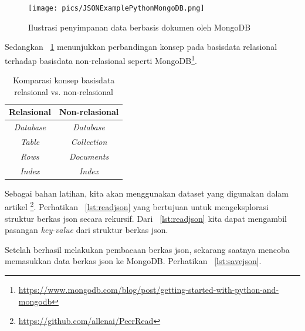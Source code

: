 \begin{figure}
  \begin{center}
    \texttt{[image: pics/JSONExamplePythonMongoDB.png]}
    \caption{Ilustrasi penyimpanan data berbasis dokumen oleh MongoDB}
    \label{fig:jsonmongo}
  \end{center}
\end{figure}

Sedangkan \tablename~\ref{tab:relasimongo} menunjukkan perbandingan konsep pada basisdata relasional terhadap basisdata non-relasional seperti MongoDB\footnote{\url{https://www.mongodb.com/blog/post/getting-started-with-python-and-mongodb}}.

\begin{table}[h]
\caption{Komparasi konsep basisdata relasional vs. non-relasional}
\label{tab:relasimongo}
  \begin{center}
    \begin{tabular}{@{}cc@{}}\toprule
    Relasional & Non-relasional\\ \midrule
  \textit{Database} & \textit{Database} \\ 
  \textit{Table} & \textit{Collection} \\
  \textit{Rows} & \textit{Documents}\\
  \textit{Index} & \textit{Index}\\
       \bottomrule
    \end{tabular}
  \end{center}
\end{table}

Sebagai bahan latihan, kita akan menggunakan dataset yang digunakan dalam artikel \cite{peerreview}\footnote{\url{https://github.com/allenai/PeerRead}}. Perhatikan \lstlistingname~\ref{lst:readjson} yang bertujuan untuk mengeksplorasi struktur berkas json secara rekursif. Dari \lstlistingname~\ref{lst:readjson} kita dapat mengambil pasangan \textit{key}-\textit{value} dari struktur berkas json.



Setelah berhasil melakukan pembacaan berkas json, sekarang saatnya mencoba memasukkan data berkas json ke MongoDB. Perhatikan \lstlistingname~\ref{lst:savejson}.



 



